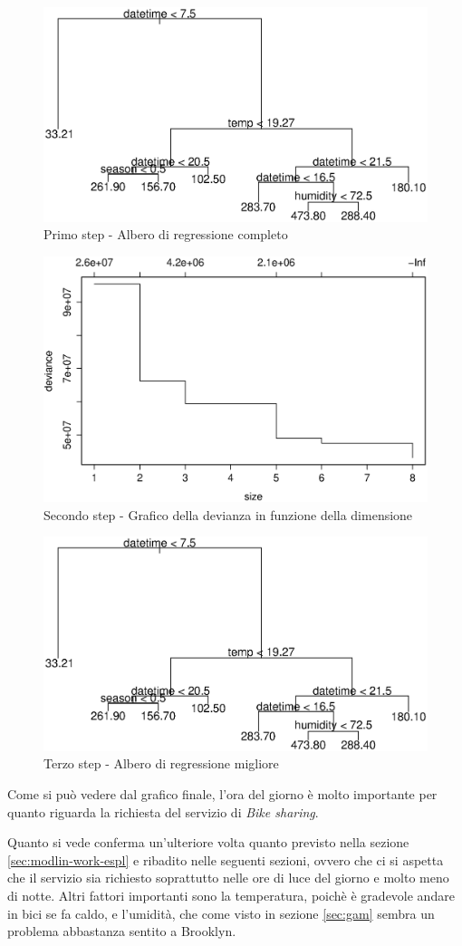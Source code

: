 \begin{figure}[H]
  \centering
  \includegraphics[width=.7\columnwidth]{images/non-linear/tree-1.eps}
  \caption{Primo step - Albero di regressione completo}
  \label{fig:tree-1}
\end{figure}

\begin{figure}[H]
  \centering
  \includegraphics[width=.7\columnwidth]{images/non-linear/tree-2.eps}
  \caption{Secondo step - Grafico della devianza in funzione della dimensione}
  \label{fig:tree-2}
\end{figure}

\begin{figure}[H]
  \centering
  \includegraphics[width=.7\columnwidth]{images/non-linear/tree-3.eps}
  \caption{Terzo step - Albero di regressione migliore}
  \label{fig:tree-3}
\end{figure}

Come si può vedere dal grafico finale, l'ora del giorno è molto importante per
quanto riguarda la richiesta del servizio di \emph{Bike sharing}.

Quanto si vede conferma un'ulteriore volta quanto previsto nella sezione
\ref{sec:modlin-work-espl} e ribadito nelle seguenti sezioni, ovvero che ci si
aspetta che il servizio sia richiesto soprattutto nelle ore di luce del
giorno e molto meno di notte. Altri fattori importanti sono la temperatura,
poichè è gradevole andare in bici se fa caldo, e l'umidità, che come visto in
sezione \ref{sec:gam} sembra un problema abbastanza sentito a Brooklyn.
